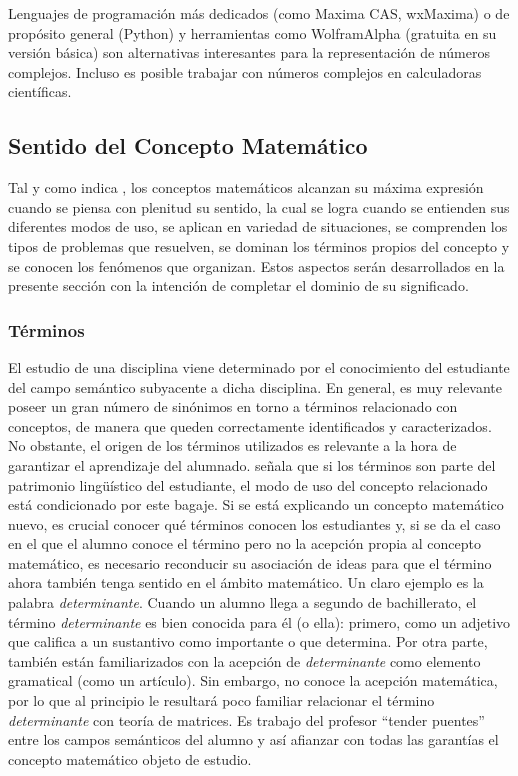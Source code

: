 \documentclass[../main.tex]{memoir}
\begin{document}
Lenguajes de programación más dedicados (como Maxima CAS, wxMaxima) o de propósito general (Python) y herramientas como WolframAlpha (gratuita en su versión básica) son alternativas interesantes para la representación de números complejos. Incluso es posible trabajar con números complejos en calculadoras científicas.

\subsection{Sentido del Concepto Matemático}

Tal y como indica \cite{rico2016}, los conceptos matemáticos alcanzan su máxima expresión cuando se piensa con plenitud su sentido, la cual se logra cuando se entienden sus diferentes modos de uso, se aplican en variedad de situaciones, se comprenden los tipos de problemas que resuelven, se dominan los términos propios del concepto y se conocen los fenómenos que organizan. Estos aspectos serán desarrollados en la presente sección con la intención de completar el dominio de su significado. 

\subsubsection{Términos}

El estudio de una disciplina viene determinado por el conocimiento del estudiante del campo semántico subyacente a dicha disciplina. En general, es muy relevante poseer un gran número de sinónimos en torno a términos relacionado con conceptos, de manera que queden correctamente identificados y caracterizados. No obstante, el origen de los términos utilizados es relevante a la hora de garantizar el aprendizaje del alumnado. \cite{rico2016} señala que si los términos son parte del patrimonio lingüístico del estudiante, el modo de uso del concepto relacionado está condicionado por este bagaje. Si se está explicando un concepto matemático nuevo, es crucial conocer qué términos conocen los estudiantes y, si se da el caso en el que el alumno conoce el término pero no la acepción propia al concepto matemático, es necesario reconducir su asociación de ideas para que el término ahora también tenga sentido en el ámbito matemático. Un claro ejemplo es la palabra \textit{determinante}. Cuando un alumno llega a segundo de bachillerato, el término \textit{determinante} es bien conocida para él (o ella): primero, como un adjetivo que califica a un sustantivo como importante o que determina. Por otra parte, también están familiarizados con la acepción de \textit{determinante} como elemento gramatical (como un artículo). Sin embargo, no conoce la acepción matemática, por lo que al principio le resultará poco familiar relacionar el término \textit{determinante} con teoría de matrices. Es trabajo del profesor ``tender puentes'' entre los campos semánticos del alumno y así afianzar con todas las garantías el concepto matemático objeto de estudio. \\
\end{document}
